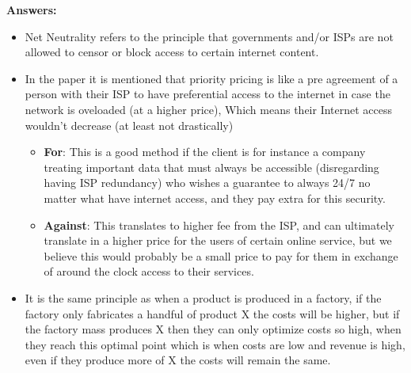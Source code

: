\documentclass{WeSTassignment}
\begin{document}
\textbf{Answers:}
\begin{itemize}
\item Net Neutrality refers to the principle that governments and/or ISPs are not allowed to censor or block access to certain internet content.
\item In the paper it is mentioned that priority pricing is like a pre agreement of a person with their ISP to have preferential access to the internet in case the network is oveloaded (at a higher price), Which means their Internet access wouldn't decrease (at least not drastically)
\begin{itemize}
\item \textbf{For}: This is a good method if the client is for instance a company treating important data that must always be accessible (disregarding having ISP redundancy) who wishes a guarantee to always 24/7 no matter what have internet access, and they pay extra for this security.
\item  \textbf{Against}: This translates to higher fee from the ISP, and can ultimately translate in a higher price for the users of certain online service, but we believe this would probably be a small price to pay for them in exchange of around the clock access to their services.
\end{itemize}
\item It is the same principle as when a product is produced in a factory, if the factory only fabricates a handful of product X the costs will be higher, but if the factory mass produces X then they can only optimize costs so high, when they reach this optimal point which is when costs are low and revenue is high, even if they produce more of X the costs will remain the same.
\end{itemize}


\makefooter
\end{document}
